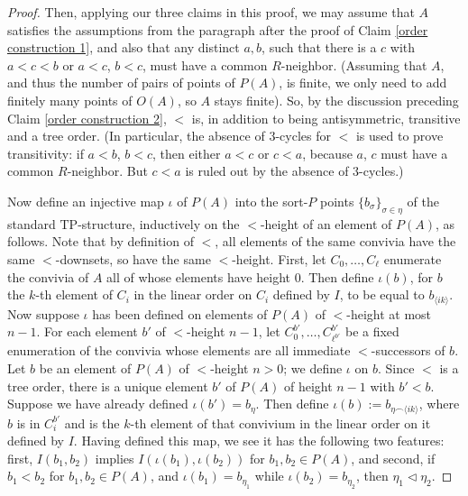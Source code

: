 \documentclass[10pt,a4paper]{amsart}
\begin{document}
\begin{proof}
Then, applying our three claims in this proof, we may assume that $A$ satisfies the assumptions from the paragraph after the proof of Claim \ref{order construction 1}, and also that any distinct $a, b$, such that there is a $c$ with $a < c < b$ or $a < c$, $b < c$, must have a common $R$-neighbor. (Assuming that $A$, and thus the number of pairs of points of $P(A)$, is finite, we only need to add finitely many points of $O(A)$, so $A$ stays finite). So, by the discussion preceding Claim \ref{order construction 2}, $<$ is, in addition to being antisymmetric, transitive and a tree order. (In particular, the absence of $3$-cycles for $<$ is used to prove transitivity: if $a< b$, $b< c$, then either $a < c$ or $c < a$, because $a$, $c$ must have a common $R$-neighbor. But $c <a$ is ruled out by the absence of $3$-cycles.)


Now define an injective map $\iota$ of $P(A)$ into the sort-$P$ points $\{b_{\sigma}\}_{\sigma \in \eta}$ of the standard $\mathrm{TP}$-structure, inductively on the $<$-height of an element of $P(A)$, as follows. Note that by definition of $<$, all elements of the same convivia have the same $<$-downsets, so have the same $<$-height. First, let $C_0, \ldots, C_\ell$ enumerate the convivia of $A$ all of whose elements have height $0$.  Then define $\iota(b)$, for $b$ the $k$-th element of $C_{i}$ in the linear order on $C_i$ defined by $I$, to be equal to $b_{\langle ik \rangle}$. Now suppose $\iota$ has been defined on elements of $P(A)$ of $<$-height at most $n-1$. For each element $b'$ of $<$-height $n -1$, let $C^{b'}_{0}, \ldots, C^{b'}_{\ell^{b'}}$ be a fixed enumeration of the convivia whose elements are all immediate $<$-successors of $b$. Let $b$ be an element of $P(A)$ of $<$-height $n > 0$; we define $\iota$ on $b$. Since $<$ is a tree order, there is a unique element $b'$ of $P(A)$ of height $n-1$ with $b' < b$.  Suppose we have already defined $\iota(b') = b_{\eta}$. Then define $\iota(b) := b_{\eta \smallfrown \langle ik \rangle}$, where $b$ is in $C^{b'}_i$ and is the $k$-th element of that convivium in the linear order on it defined by $I$. Having defined this map, we see it has the following two features: first, $I(b_1, b_2)$ implies $I(\iota(b_1), \iota(b_2))$ for $b_1, b_2 \in P(A)$, and second, if $b_1 < b_2$ for $b_1, b_2 \in P(A)$, and $\iota(b_1)=b_{\eta_1}$ while $\iota(b_2) = b_{\eta_2}$, then $\eta_{1} \lhd \eta_2$.



\end{proof}
\end{document}
